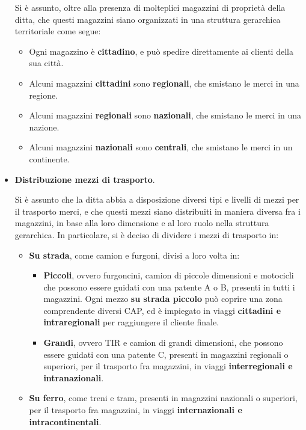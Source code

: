 \begin{itemize}
  Si è assunto, oltre alla presenza di molteplici magazzini di proprietà della ditta, che questi magazzini siano organizzati in una struttura gerarchica territoriale come segue:
  \begin{itemize}
    \item Ogni magazzino è \textbf{cittadino}, e può spedire direttamente ai clienti della sua città.
    \item Alcuni magazzini \textbf{cittadini} sono \textbf{regionali}, che smistano le merci in una regione.
    \item Alcuni magazzini \textbf{regionali} sono \textbf{nazionali}, che smistano le merci in una nazione.
    \item Alcuni magazzini \textbf{nazionali} sono \textbf{centrali}, che smistano le merci in un continente.
    \end{itemize}

  \item \textbf{Distribuzione mezzi di trasporto}.
  
  Si è assunto che la ditta abbia a disposizione diversi tipi e livelli di mezzi per il trasporto merci, e che questi mezzi siano distribuiti in maniera diversa fra i magazzini, in base alla loro dimensione e al loro ruolo nella struttura gerarchica. In particolare, si è deciso di dividere i mezzi di trasporto in:
  
  \begin{itemize}
    \item \textbf{Su strada}, come camion e furgoni, divisi a loro volta in:
      \begin{itemize}
        \item \textbf{Piccoli}, ovvero furgoncini, camion di piccole dimensioni e motocicli che possono essere guidati con una patente A o B, presenti in tutti i magazzini. Ogni mezzo \textbf{su strada piccolo} può coprire una zona comprendente diversi CAP, ed è impiegato in viaggi \textbf{cittadini e intraregionali} per raggiungere il cliente finale.
        \item \textbf{Grandi}, ovvero TIR e camion di grandi dimensioni, che possono essere guidati con una patente C, presenti in magazzini regionali o superiori, per il trasporto fra magazzini, in viaggi \textbf{interregionali e intranazionali}.
      \end{itemize}
    
    \item \textbf{Su ferro}, come treni e tram, presenti in magazzini nazionali o superiori, per il trasporto fra magazzini, in viaggi \textbf{internazionali e intracontinentali}.
    

\end{itemize}
\end{itemize}
